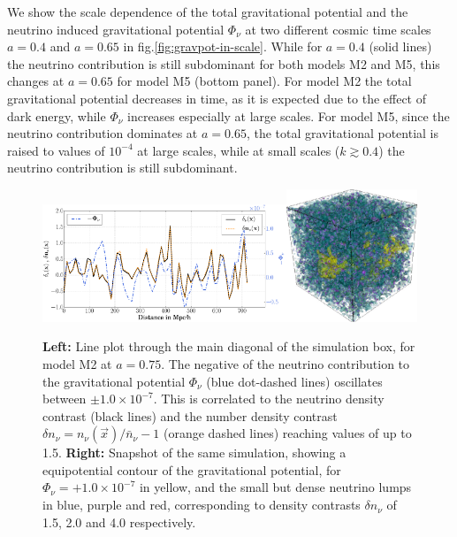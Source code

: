 We show the scale dependence of the total gravitational potential
and the neutrino induced gravitational potential $\Phi_{\nu}$ at
two different cosmic time scales $a=0.4$ and $a=0.65$ in fig.\ref{fig:gravpot-in-scale}.
While for $a=0.4$ (solid lines) the neutrino contribution is still
subdominant for both models M2 and M5, this changes at $a=0.65$ for
model M5 (bottom panel). For model M2 the total gravitational potential
decreases in time, as it is expected due to the effect of dark energy,
while $\Phi_{\nu}$ increases especially at large scales. For model
M5, since the neutrino contribution dominates at $a=0.65$, the total
gravitational potential is raised to values of $10^{-4}$ at large
scales, while at small scales ($k\gtrsim0.4$) the neutrino contribution
is still subdominant.

\begin{figure}
\centering{}\includegraphics[width=0.65\textwidth]{Chapters/gnq/figures/Lineout-Diagonal--at-a0p75-deltanu_numbnu_Phinu}\includegraphics[width=0.35\textwidth]{Chapters/gnq/figures/model2-psinu-numbnu-a0p75-cropped}\protect
\caption[Line plot of the gravitational potential and snapshot for model M2 in GNQ.]{\label{fig:lineout-gravpotnu} 
\textbf{Left: }Line plot through the
main diagonal of the simulation box, for model M2 at $a=0.75$. The
negative of the neutrino contribution to the gravitational potential
$\Phi_{\nu}$ (blue dot-dashed lines) oscillates between $\pm1.0\times10^{-7}$.
This is correlated to the neutrino density contrast (black lines)
and the number density contrast $\delta n_{\nu}=n_{\nu}(\vec{x})/\bar{n}_{\nu}-1$
(orange dashed lines) reaching values of up to 1.5. \textbf{Right:
}Snapshot of the same simulation, showing a equipotential contour
of the gravitational potential, for $\Phi_{\nu}=+1.0\times10^{-7}$
in yellow, and the small but dense neutrino lumps in blue, purple
and red, corresponding to density contrasts $\delta n_{\nu}$ of 1.5,
2.0 and 4.0 respectively.}
\end{figure}


